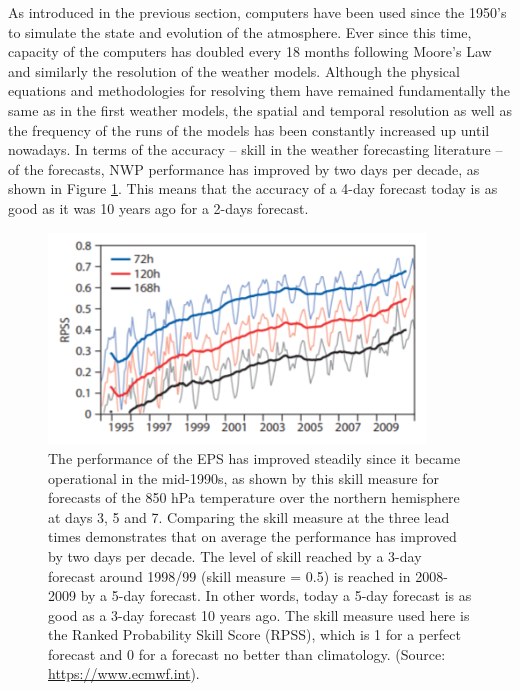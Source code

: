 As introduced in the previous section, computers have been used since the 1950's to simulate the state and evolution of the atmosphere. Ever since this time, capacity of the computers has doubled every 18 months following Moore's Law and similarly the resolution of the weather models. Although the physical equations and methodologies for resolving them have remained fundamentally the same as in the first weather models, the spatial and temporal resolution as well as the frequency of the runs of the models has been constantly increased up until nowadays. In terms of the accuracy -- skill in the weather forecasting literature -- of the forecasts, NWP performance has improved by two days per decade, as shown in Figure \ref{model_improvement}. This means that the accuracy of a 4-day forecast today is as good as it was 10 years ago for a 2-days forecast.

\medskip

\begin{figure}[h]
 \centerline{\includegraphics[width=10cm]{model_skill.png}} \caption{The performance of the EPS has improved steadily since it became operational in the mid-1990s, as shown by this skill measure for forecasts of the 850 hPa temperature over the northern hemisphere at days 3, 5 and 7. Comparing the skill measure at the three lead times demonstrates that on average the performance has improved by two days per decade. The level of skill reached by a 3-day forecast around 1998/99 (skill measure = 0.5) is reached in 2008-2009 by a 5-day forecast. In other words, today a 5-day forecast is as good as a 3-day forecast 10 years ago. The skill measure used here is the Ranked Probability Skill Score (RPSS), which is 1 for a perfect forecast and 0 for a forecast no better than climatology. (Source: \url{https://www.ecmwf.int}).}\label{model_improvement}
\end{figure}

